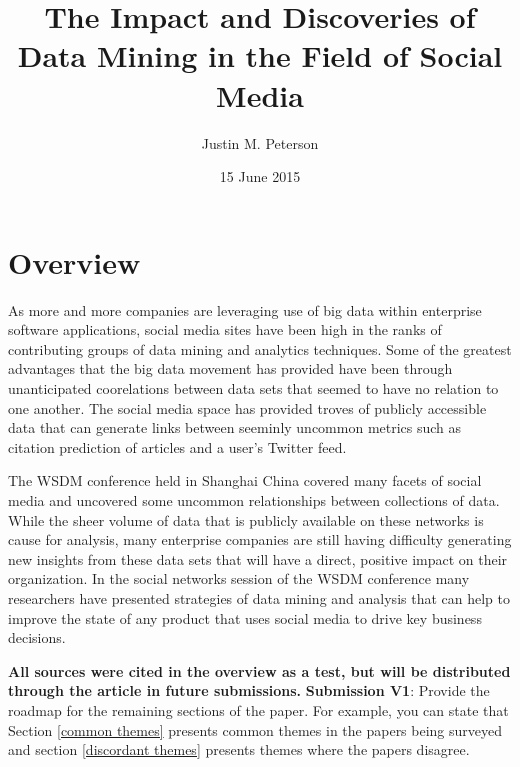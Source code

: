 \documentclass{sig-alternate}
\begin{document}
\title{The Impact and Discoveries of Data Mining in the Field of Social Media}
\author{
\alignauthor
Justin M. Peterson
}
\date{15 June 2015}
\maketitle
\begin{abstract}
\end{abstract}

\section{Overview}
\label{overview}

As more and more companies are leveraging use of big data within
enterprise software applications, social media sites have been high in the 
ranks of contributing groups of data mining and analytics techniques. Some of the
greatest advantages that the big data movement has provided have been through
unanticipated coorelations between data sets that seemed to have no relation
to one another. The social media space has provided troves of publicly accessible 
data that can generate links between seeminly uncommon metrics such as citation prediction
of articles and a user's Twitter feed. \cite{PMC:articles/PMC3278109}

The WSDM conference held in Shanghai China \cite{DBLP:conf/wsdm/2015}
covered many facets of social media and uncovered some uncommon 
relationships between collections of data. While the sheer volume
of data that is publicly available on these networks is cause for analysis, many enterprise
companies are still having difficulty generating new insights from these data sets that
will have a direct, positive impact on their organization. In the social networks session
of the WSDM conference many researchers have presented strategies of data mining and analysis \cite{DBLP:conf/wsdm/RajadesinganZL15}
\cite{DBLP:conf/wsdm/FlatowNXVK15} \cite{DBLP:conf/wsdm/LattanziS15}
that can help to improve the state of any product that uses social media to drive key business 
decisions.

\textbf{All sources were cited in the overview as a test, but will be distributed through the
article in future submissions.}
\textbf{Submission V1}:
Provide the roadmap for the remaining sections of the
paper. For example, you can state that Section \ref{common
  themes} presents common themes in the papers being
surveyed and section \ref{discordant themes} presents
themes where the papers disagree.  
\end{document}
